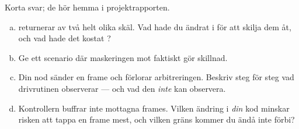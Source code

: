 \label{ex:10:4}
Korta svar; de hör hemma i projektrapporten.
\begin{enumerate}[a)]
  \item {} returnerar  av två helt olika skäl. Vad hade du ändrat i
     för att skilja dem åt, och vad hade det kostat ?
  \item Ge ett scenario där maskeringen mot  faktiskt gör skillnad.
  \item Din nod sänder en frame och förlorar arbitreringen. Beskriv steg för steg vad drivrutinen
    observerar --- och vad den \emph{inte} kan observera.
  \item Kontrollern buffrar inte mottagna frames. Vilken ändring i \emph{din} kod minskar risken
    att tappa en frame mest, och vilken gräns kommer du ändå inte förbi?
\end{enumerate}
